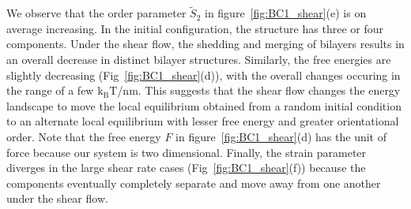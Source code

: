 \documentclass[prb,preprint,showpacs,preprintnumbers,amsmath,amssymb,longbibliography]{revtex4-1}
\begin{document}
We observe that the order parameter $\tilde S_2$ in figure~\ref{fig:BC1_shear}(e)
is on average increasing.  In the initial configuration,
the structure has three or four components.  
%
Under the shear flow, the shedding and merging of bilayers
results in an overall decrease in distinct bilayer structures.  
Similarly, the free energies 
are slightly decreasing (Fig~\ref{fig:BC1_shear}(d)),
with the overall changes occuring in the range of a few $\mathrm{k_BT}$/nm.  
This suggests that
the shear flow changes the energy landscape to move the local equilibrium obtained from a random initial condition
to an alternate local equilibrium with lesser free energy and greater orientational order.   
Note that the free energy $F$ in figure~\ref{fig:BC1_shear}(d) has the unit of force because our system is two dimensional.
%
%
Finally, the strain parameter diverges in the large shear rate cases (Fig~\ref{fig:BC1_shear}(f))
because the components eventually completely separate and move away from one another
under the shear flow.
\end{document}

